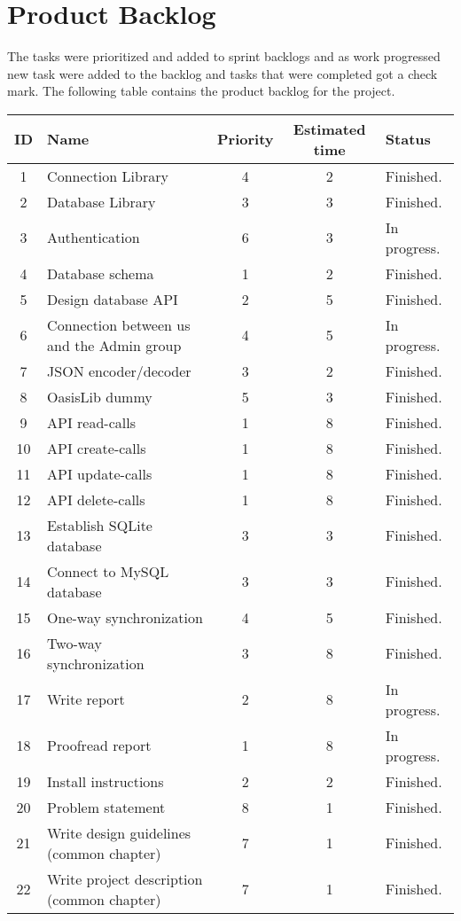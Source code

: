 \section{Product Backlog}
The tasks were prioritized and added to sprint backlogs and as work progressed new task were added to the backlog and tasks that were completed got a check mark. The following table contains the product backlog for the project.

\begin{center}
	\begin{tabular}{| c | p{4cm} | c | c | l |}
	\hline
	\textbf{ID} 	& \textbf{Name} 										& \textbf{Priority} 	& \textbf{Estimated time} 	& \textbf{Status} 			\\ 	\hline
	1 	& Connection Library 						& 4 		& 2 				& Finished. 		\\	\hline
	2 	& Database Library 							& 3 		& 3 				& Finished. 		\\	\hline
	3 	& Authentication 							& 6 		& 3 				& In progress. 		\\ 	\hline
	4 	& Database schema 							& 1 		& 2 				& Finished. 		\\	\hline
	5 	& Design database API 						& 2 		& 5 				& Finished. 		\\	\hline
	6 	& Connection between us and the Admin group & 4 		& 5 				& In progress. 		\\ 	\hline
	7 	& JSON encoder/decoder 						& 3 		& 2 				& Finished. 		\\	\hline
	8 	& OasisLib dummy							& 5 		& 3 				& Finished. 		\\	\hline
	9 	& API read-calls 							& 1 		& 8 				& Finished. 		\\ 	\hline
	10 	& API create-calls 							& 1 		& 8 				& Finished. 		\\	\hline
	11 	& API update-calls 							& 1 		& 8 				& Finished. 		\\	\hline
	12	& API delete-calls							& 1 		& 8 				& Finished. 		\\ 	\hline
	13 	& Establish SQLite database 				& 3 		& 3 				& Finished. 		\\	\hline
	14	& Connect to MySQL database 				& 3 		& 3 				& Finished. 		\\	\hline
	15	& One-way synchronization					& 4 		& 5 				& Finished. 		\\ 	\hline
	16	& Two-way synchronization					& 3 		& 8 				& Finished. 		\\	\hline
	17	& Write report								& 2 		& 8 				& In progress. 		\\	\hline
	18	& Proofread report 							& 1 		& 8 				& In progress. 		\\ 	\hline
	19	& Install instructions 						& 2 		& 2 				& Finished. 		\\	\hline
	20	& Problem statement							& 8 		& 1 				& Finished. 		\\	\hline
	21	& Write	design guidelines (common chapter)	& 7 		& 1 				& Finished. 		\\ 	\hline
	22	& Write	project description (common chapter)& 7 		& 1 				& Finished. 		\\ 	\hline
	\end{tabular}
\end{center}